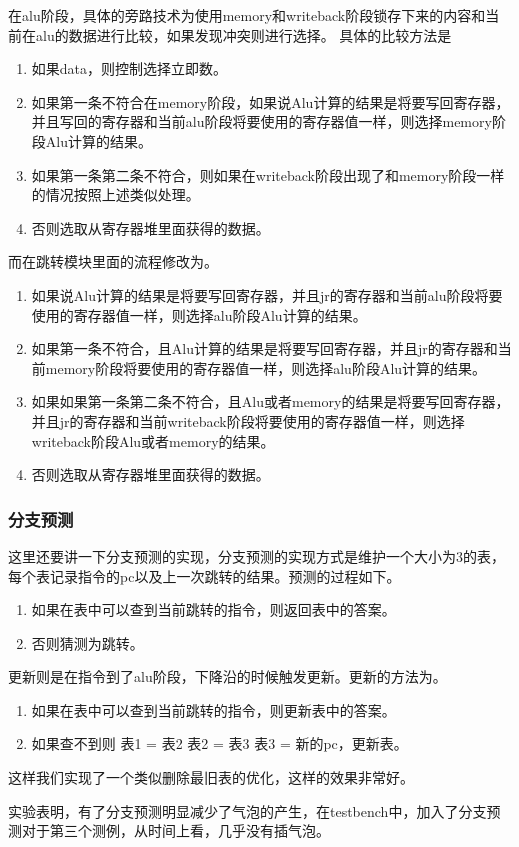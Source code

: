 在alu阶段，具体的旁路技术为使用memory和writeback阶段锁存下来的内容和当前在alu的数据进行比较，如果发现冲突则进行选择。
具体的比较方法是
\begin{enumerate}
        \item 如果data，则控制选择立即数。
        \item 如果第一条不符合在memory阶段，如果说Alu计算的结果是将要写回寄存器，并且写回的寄存器和当前alu阶段将要使用的寄存器值一样，则选择memory阶段Alu计算的结果。
        \item 如果第一条第二条不符合，则如果在writeback阶段出现了和memory阶段一样的情况按照上述类似处理。
        \item 否则选取从寄存器堆里面获得的数据。        
\end{enumerate}
而在跳转模块里面的流程修改为。
\begin{enumerate}
        \item 如果说Alu计算的结果是将要写回寄存器，并且jr的寄存器和当前alu阶段将要使用的寄存器值一样，则选择alu阶段Alu计算的结果。
        \item 如果第一条不符合，且Alu计算的结果是将要写回寄存器，并且jr的寄存器和当前memory阶段将要使用的寄存器值一样，则选择alu阶段Alu计算的结果。
        \item 如果如果第一条第二条不符合，且Alu或者memory的结果是将要写回寄存器，并且jr的寄存器和当前writeback阶段将要使用的寄存器值一样，则选择writeback阶段Alu或者memory的结果。
        \item 否则选取从寄存器堆里面获得的数据。        
\end{enumerate}

\subsubsection{分支预测}
这里还要讲一下分支预测的实现，分支预测的实现方式是维护一个大小为3的表，每个表记录指令的pc以及上一次跳转的结果。预测的过程如下。
\begin{enumerate}
        \item 如果在表中可以查到当前跳转的指令，则返回表中的答案。
        \item 否则猜测为跳转。
\end{enumerate}
更新则是在指令到了alu阶段，下降沿的时候触发更新。更新的方法为。
\begin{enumerate}
        \item 如果在表中可以查到当前跳转的指令，则更新表中的答案。
        \item 如果查不到则  表1  =  表2  表2  =  表3  表3  =  新的pc，更新表。
\end{enumerate}
这样我们实现了一个类似删除最旧表的优化，这样的效果非常好。

实验表明，有了分支预测明显减少了气泡的产生，在testbench中，加入了分支预测对于第三个测例，从时间上看，几乎没有插气泡。

